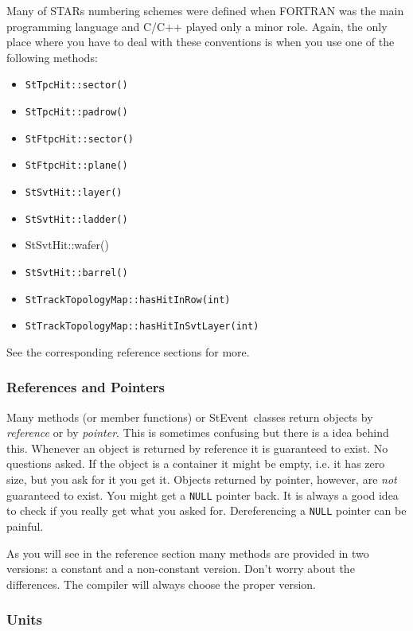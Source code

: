 \documentclass[twoside]{article}
\newcommand{\StEvent}{\textsf{StEvent}}
\begin{document}
Many of STARs numbering schemes were defined when FORTRAN was the main
programming language and C/C++ played only a minor role. Again, the only
place where you have to deal with these conventions is when you use one of the
following methods:
\begin{itemize}
\item \texttt{StTpcHit::sector()}
\item \texttt{StTpcHit::padrow()}
\item \texttt{StFtpcHit::sector()}
\item \texttt{StFtpcHit::plane()}
\item \texttt{StSvtHit::layer()}
\item \texttt{StSvtHit::ladder()}
\item \textrm{StSvtHit::wafer(})
\item \texttt{StSvtHit::barrel()}
\item \texttt{StTrackTopologyMap::hasHitInRow(int)}
\item \texttt{StTrackTopologyMap::hasHitInSvtLayer(int)}
\end{itemize}
See the corresponding reference sections for more.

\subsubsection{References and Pointers}
 

Many methods (or member functions) or \StEvent\ classes return objects
by \emph{reference} or by \emph{pointer}. This is sometimes confusing
but there is a idea behind this. Whenever an object is returned by
reference it is guaranteed to exist. No questions asked. If the object
is a container it might be empty, i.e. it has zero size, but you ask
for it you get it. Objects returned by pointer, however, are
\emph{not} guaranteed to exist. You might get a \texttt{NULL} pointer
back.  It is always a good idea to check if you really get what you
asked for.  Dereferencing a \texttt{NULL} pointer can be painful.

As you will see in the reference section many methods are provided in
two versions: a constant and a non-constant version. Don't worry about
the differences. The compiler will always choose the proper version.

\subsubsection{Units}
\label{sec:units}
 
\end{document}
